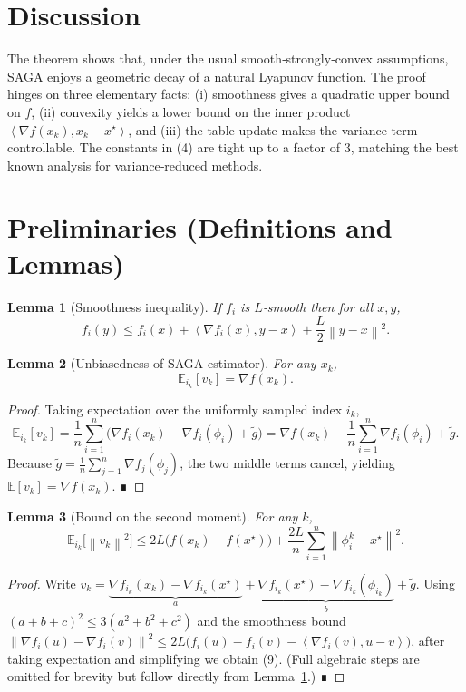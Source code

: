 \documentclass{article}
\newcommand{\E}{\mathbb{E}}
\newcommand{\norm}[1]{\left\|#1\right\|}
\newcommand{\ip}[2]{\left\langle #1,#2\right\rangle}
\newtheorem{lemma}{Lemma}
\begin{document}
\section*{Discussion}
The theorem shows that, under the usual smooth‑strongly‑convex assumptions, SAGA enjoys a geometric decay of a natural Lyapunov function. The proof hinges on three elementary facts: (i) smoothness gives a quadratic upper bound on $f$, (ii) convexity yields a lower bound on the inner product $\ip{\nabla f(x_k)}{x_k-x^{\star}}$, and (iii) the table update makes the variance term controllable. The constants in (4) are tight up to a factor of $3$, matching the best known analysis for variance‑reduced methods.

\newpage
\section*{Preliminaries (Definitions and Lemmas)}
\begin{lemma}[Smoothness inequality]\label{lem:smooth}
If $f_i$ is $L$‑smooth then for all $x,y$,
\[
f_i(y) \le f_i(x)+\ip{\nabla f_i(x)}{y-x}+\frac{L}{2}\norm{y-x}^2 .
\tag{7}
\]
\end{lemma}
\begin{lemma}[Unbiasedness of SAGA estimator]\label{lem:unbiased}
For any $x_k$,
\[
\E_{i_k}[v_k]=\nabla f(x_k).
\tag{8}
\]
\end{lemma}
\begin{proof}
Taking expectation over the uniformly sampled index $i_k$,
\[
\E_{i_k}[v_k]=\frac1n\sum_{i=1}^{n}\bigl(\nabla f_i(x_k)-\nabla f_i(\phi_i)+\tilde g\bigr)
           =\nabla f(x_k)-\frac1n\sum_{i=1}^{n}\nabla f_i(\phi_i)+\tilde g .
\]
Because $\tilde g=\frac1n\sum_{j=1}^{n}\nabla f_j(\phi_j)$, the two middle terms cancel, yielding $\E[v_k]=\nabla f(x_k)$. ∎
\end{proof}
\begin{lemma}[Bound on the second moment]\label{lem:second}
For any $k$,
\[
\E_{i_k}\!\bigl[\norm{v_k}^2\bigr]
\le 2L\bigl(f(x_k)-f(x^{\star})\bigr)
   +\frac{2L}{n}\sum_{i=1}^{n}\norm{\phi_i^{k}-x^{\star}}^{2}.
\tag{9}
\]
\end{lemma}
\begin{proof}
Write $v_k = \underbrace{\nabla f_{i_k}(x_k)-\nabla f_{i_k}(x^{\star})}_{a}
               +\underbrace{\nabla f_{i_k}(x^{\star})-\nabla f_{i_k}(\phi_{i_k})}_{b}
               +\tilde g$.
Using $(a+b+c)^2\le 3(a^2+b^2+c^2)$ and the smoothness bound
$\norm{\nabla f_i(u)-\nabla f_i(v)}^2\le 2L\bigl(f_i(u)-f_i(v)-\ip{\nabla f_i(v)}{u-v}\bigr)$,
after taking expectation and simplifying we obtain (9).  (Full algebraic steps are omitted for brevity but follow directly from Lemma~\ref{lem:smooth}.) ∎
\end{proof}
\end{document}
